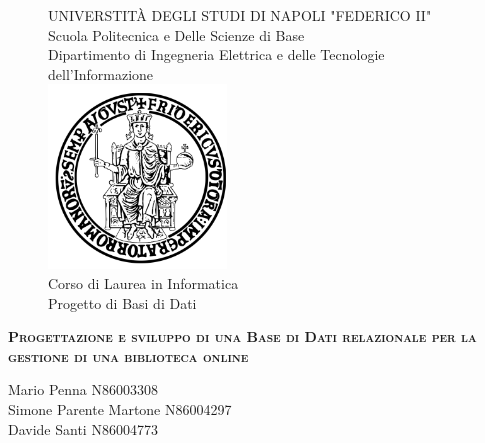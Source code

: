 \documentclass{report}
\begin{document}
\begin{sloppypar}
    \begin{figure}[htbp!]
        \begin{center}
            UNIVERSTIT\`A DEGLI STUDI DI NAPOLI "FEDERICO II" \\
            Scuola Politecnica e Delle Scienze di Base \\
            Dipartimento di Ingegneria Elettrica e delle Tecnologie dell'Informazione \\
            \includegraphics[width=.25\textwidth]{Immagini/FedericoII.png} \\
            Corso di Laurea in Informatica \\
            Progetto di Basi di Dati \\
        \end{center}
    \end{figure}
    
    {\scshape\Large\bfseries Progettazione e sviluppo di una Base di Dati relazionale per la gestione di una biblioteca online}
    
    \begin{center}
        Mario Penna N86003308 \\ Simone Parente Martone N86004297 \\ Davide Santi N86004773
    \end{center}
    
    \newpage
    
    \tableofcontents
    
    
    
    
    


\end{sloppypar}
\end{document}
